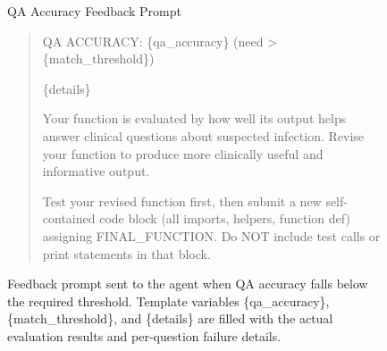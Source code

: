 \begin{figure}[h]
    \begin{AIbox}{QA Accuracy Feedback Prompt}

\begin{quote}
\ttfamily
\tiny
\vspace{2mm}

QA ACCURACY: \{qa\_accuracy\} (need >\{match\_threshold\})

\{details\}

Your function is evaluated by how well its output helps answer clinical
questions about suspected infection. Revise your function to produce more
clinically useful and informative output.

Test your revised function first, then submit a new self-contained code
block (all imports, helpers, function def) assigning FINAL\_FUNCTION.
Do NOT include test calls or print statements in that block.

\end{quote}

\end{AIbox}
    \caption{Feedback prompt sent to the agent when QA accuracy falls below the required threshold. Template variables \{qa\_accuracy\}, \{match\_threshold\}, and \{details\} are filled with the actual evaluation results and per-question failure details.}
    \label{prompts:comparison_feedback}

\end{figure}
